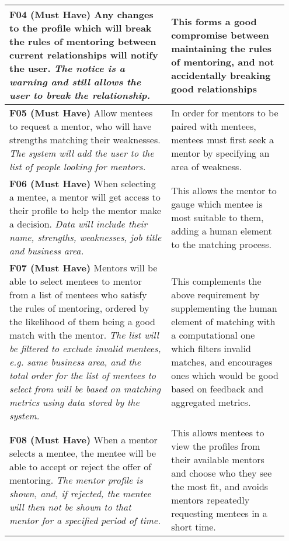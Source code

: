 \documentclass[10pt]{article}
\begin{document}
\begin{longtable}{|p{0.55\linewidth}|p{0.4\linewidth}|}
    \textbf{F04 (Must Have) }
    Any changes to the profile which will break the rules of mentoring between
    current relationships will notify the user.
    \textit{The notice is a warning and still allows the user to break the
    relationship.}
        &
    This forms a good compromise between maintaining the rules of mentoring,
    and not accidentally breaking good relationships
    \\ \hline

    \textbf{F05 (Must Have) }
    Allow mentees to request a mentor, who will have strengths matching their       %
    weaknesses.
    \textit{The system will add the user to the list of people looking for
    mentors.}
        &
    In order for mentors to be paired with mentees, mentees must first seek a
    mentor by specifying an area of weakness.
    \\ \hline

    \textbf{F06 (Must Have) }
    When selecting a mentee, a mentor will get access to their profile to help
    the mentor make a decision.
    \textit{Data will include their name, strengths, weaknesses, job title and
    business area.}
        &
    This allows the mentor to gauge which mentee is most suitable to them,
    adding a human element to the matching process.
    \\ \hline

    \textbf{F07 (Must Have) }
    Mentors will be able to select mentees to mentor from a list of mentees who
    satisfy the rules of mentoring, ordered by the likelihood of them being a
    good match with the mentor.
    \textit{The list will be filtered to exclude invalid mentees, e.g. same
    business area, and the total order for the list of mentees to select from
    will be based on matching metrics using data stored by the system.}             %
        &
    This complements the above requirement by supplementing the human element of
    matching with a computational one which filters invalid matches, and
    encourages ones which would be good based on feedback and aggregated
    metrics.
    \\ \hline

    \textbf{F08 (Must Have) }
    When a mentor selects a mentee, the mentee will be able to accept or reject
    the offer of mentoring.
    \textit{The mentor profile is shown, and, if rejected, the mentee will then
    not be shown to that mentor for a specified period of time.}
        &
    This allows mentees to view the profiles from their available mentors and
    choose who they see the most fit, and avoids mentors repeatedly requesting
    mentees in a short time.
    \\ \hline


\end{longtable}
\end{document}
